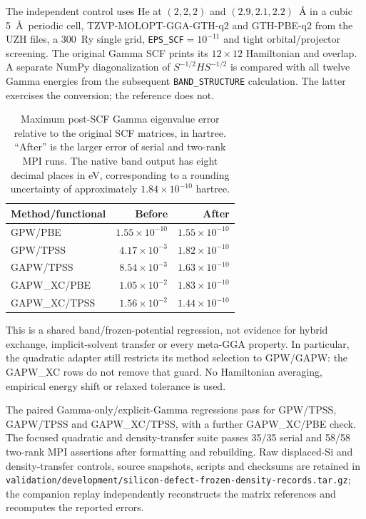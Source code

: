 \documentclass[11pt]{article}
\begin{document}
The independent control uses He at $(2,2,2)$ and $(2.9,2.1,2.2)$~\AA
in a cubic 5~\AA\ periodic cell, TZVP-MOLOPT-GGA-GTH-q2 and
GTH-PBE-q2 from the UZH files, a 300~Ry single grid,
\texttt{EPS\_SCF}$=10^{-11}$ and tight orbital/projector screening.
The original Gamma SCF prints its $12\times12$ Hamiltonian and
overlap. A separate NumPy diagonalization of
$S^{-1/2}HS^{-1/2}$ is compared with all twelve Gamma energies
from the subsequent \texttt{BAND\_STRUCTURE} calculation.
The latter exercises the conversion; the reference does not.

\begin{table}[htbp]
\centering
\caption{Maximum post-SCF Gamma eigenvalue error relative to
the original SCF matrices, in hartree. ``After'' is the larger
error of serial and two-rank MPI runs. The native band output
has eight decimal places in eV, corresponding to a rounding
uncertainty of approximately $1.84\times10^{-10}$ hartree.}
\label{tab:frozen-density}
\begin{tabular}{lrr}
\toprule
Method/functional & Before & After\\
\midrule
GPW/PBE & $1.55\times10^{-10}$ & $1.55\times10^{-10}$\\
GPW/TPSS & $4.17\times10^{-3}$ & $1.82\times10^{-10}$\\
GAPW/TPSS & $8.54\times10^{-3}$ & $1.63\times10^{-10}$\\
GAPW\_XC/PBE & $1.05\times10^{-2}$ & $1.83\times10^{-10}$\\
GAPW\_XC/TPSS & $1.56\times10^{-2}$ & $1.44\times10^{-10}$\\
\bottomrule
\end{tabular}
\end{table}

This is a shared band/frozen-potential regression, not evidence
for hybrid exchange, implicit-solvent transfer or every
meta-GGA property. In particular, the quadratic adapter still
restricts its method selection to GPW/GAPW: the GAPW\_XC rows
do not remove that guard. No Hamiltonian averaging, empirical
energy shift or relaxed tolerance is used.

\begin{samepage}
The paired Gamma-only/explicit-Gamma regressions pass for GPW/TPSS,
GAPW/TPSS and GAPW\_XC/TPSS, with a further GAPW\_XC/PBE check.
The focused quadratic and density-transfer suite passes 35/35
serial and 58/58 two-rank MPI assertions after formatting and
rebuilding. Raw displaced-Si and density-transfer controls,
source snapshots, scripts and checksums are retained in
\nolinkurl{validation/development/silicon-defect-frozen-density-records.tar.gz};
the companion replay independently reconstructs the matrix
references and recomputes the reported errors.
\end{samepage}
\end{document}
